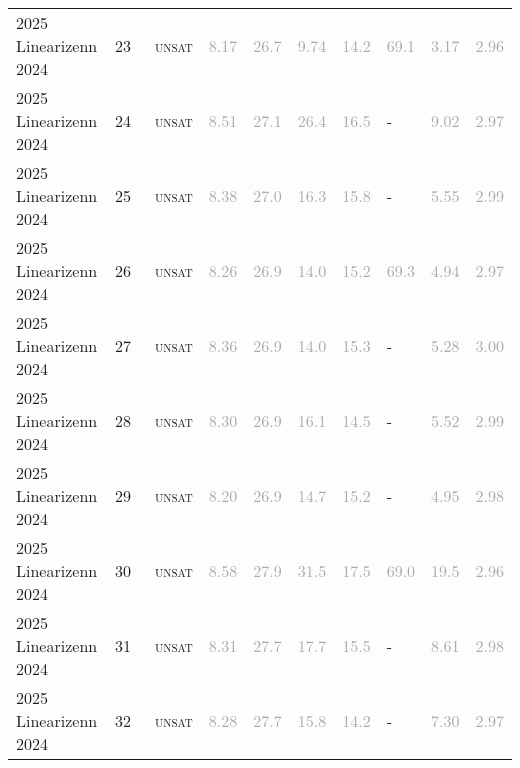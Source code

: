 \begin{center}
{\begin{longtable}{@{}llllllllll@{}}
2025 Linearizenn 2024 & 23 & ~\textsc{unsat} & \textcolor{darkgray}{8.17} & \textcolor{darkgray}{26.7} & \textcolor{darkgray}{9.74} & \textcolor{darkgray}{14.2} & \textcolor{darkgray}{69.1} & \textcolor{darkgray}{3.17} & \textcolor{darkgray}{2.96} \\
2025 Linearizenn 2024 & 24 & ~\textsc{unsat} & \textcolor{darkgray}{8.51} & \textcolor{darkgray}{27.1} & \textcolor{darkgray}{26.4} & \textcolor{darkgray}{16.5} & - & \textcolor{darkgray}{9.02} & \textcolor{darkgray}{2.97} \\
2025 Linearizenn 2024 & 25 & ~\textsc{unsat} & \textcolor{darkgray}{8.38} & \textcolor{darkgray}{27.0} & \textcolor{darkgray}{16.3} & \textcolor{darkgray}{15.8} & - & \textcolor{darkgray}{5.55} & \textcolor{darkgray}{2.99} \\
2025 Linearizenn 2024 & 26 & ~\textsc{unsat} & \textcolor{darkgray}{8.26} & \textcolor{darkgray}{26.9} & \textcolor{darkgray}{14.0} & \textcolor{darkgray}{15.2} & \textcolor{darkgray}{69.3} & \textcolor{darkgray}{4.94} & \textcolor{darkgray}{2.97} \\
2025 Linearizenn 2024 & 27 & ~\textsc{unsat} & \textcolor{darkgray}{8.36} & \textcolor{darkgray}{26.9} & \textcolor{darkgray}{14.0} & \textcolor{darkgray}{15.3} & - & \textcolor{darkgray}{5.28} & \textcolor{darkgray}{3.00} \\
2025 Linearizenn 2024 & 28 & ~\textsc{unsat} & \textcolor{darkgray}{8.30} & \textcolor{darkgray}{26.9} & \textcolor{darkgray}{16.1} & \textcolor{darkgray}{14.5} & - & \textcolor{darkgray}{5.52} & \textcolor{darkgray}{2.99} \\
2025 Linearizenn 2024 & 29 & ~\textsc{unsat} & \textcolor{darkgray}{8.20} & \textcolor{darkgray}{26.9} & \textcolor{darkgray}{14.7} & \textcolor{darkgray}{15.2} & - & \textcolor{darkgray}{4.95} & \textcolor{darkgray}{2.98} \\
2025 Linearizenn 2024 & 30 & ~\textsc{unsat} & \textcolor{darkgray}{8.58} & \textcolor{darkgray}{27.9} & \textcolor{darkgray}{31.5} & \textcolor{darkgray}{17.5} & \textcolor{darkgray}{69.0} & \textcolor{darkgray}{19.5} & \textcolor{darkgray}{2.96} \\
2025 Linearizenn 2024 & 31 & ~\textsc{unsat} & \textcolor{darkgray}{8.31} & \textcolor{darkgray}{27.7} & \textcolor{darkgray}{17.7} & \textcolor{darkgray}{15.5} & - & \textcolor{darkgray}{8.61} & \textcolor{darkgray}{2.98} \\
2025 Linearizenn 2024 & 32 & ~\textsc{unsat} & \textcolor{darkgray}{8.28} & \textcolor{darkgray}{27.7} & \textcolor{darkgray}{15.8} & \textcolor{darkgray}{14.2} & - & \textcolor{darkgray}{7.30} & \textcolor{darkgray}{2.97} \\

\end{longtable}}
\end{center}
